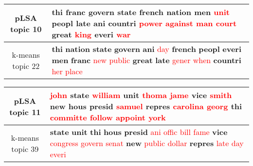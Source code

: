 \begin{center}\begin{tabularx}{\textwidth} {
  | c | >{\raggedright\arraybackslash}X | } \hline 
pLSA topic 10 & \textbf{thi} \textbf{franc} \textbf{govern} \textbf{state} \textbf{french} \textbf{nation} \textbf{men} \textcolor{red}{unit} \textbf{peopl} \textbf{late} \textbf{ani} \textbf{countri} \textcolor{red}{power} \textcolor{red}{against} \textcolor{red}{man} \textcolor{red}{court} \textbf{great} \textcolor{red}{king} \textbf{everi} \textcolor{red}{war} \\ \hline 
k-means topic 22 & \textbf{thi} \textbf{nation} \textbf{state} \textbf{govern} \textbf{ani} \textcolor{red}{day} \textbf{french} \textbf{peopl} \textbf{everi} \textbf{men} \textbf{franc} \textcolor{red}{new} \textcolor{red}{public} \textbf{great} \textbf{late} \textcolor{red}{gener} \textcolor{red}{when} \textbf{countri} \textcolor{red}{her} \textcolor{red}{place} \\ \hline 
\end{tabularx}

\end{center}

\begin{center}\begin{tabularx}{\textwidth} {
  | c | >{\raggedright\arraybackslash}X | } \hline 
pLSA topic 11 & \textcolor{red}{john} \textbf{state} \textcolor{red}{william} \textbf{unit} \textcolor{red}{thoma} \textcolor{red}{jame} \textbf{vice} \textcolor{red}{smith} \textbf{new} \textbf{hous} \textbf{presid} \textcolor{red}{samuel} \textbf{repres} \textcolor{red}{carolina} \textcolor{red}{georg} \textbf{thi} \textcolor{red}{committe} \textcolor{red}{follow} \textcolor{red}{appoint} \textcolor{red}{york} \\ \hline 
k-means topic 39 & \textbf{state} \textbf{unit} \textbf{thi} \textbf{hous} \textbf{presid} \textcolor{red}{ani} \textcolor{red}{offic} \textcolor{red}{bill} \textcolor{red}{fame} \textbf{vice} \textcolor{red}{congress} \textcolor{red}{govern} \textcolor{red}{senat} \textbf{new} \textcolor{red}{public} \textcolor{red}{dollar} \textbf{repres} \textcolor{red}{late} \textcolor{red}{day} \textcolor{red}{everi} \\ \hline 
\end{tabularx}

\end{center}

